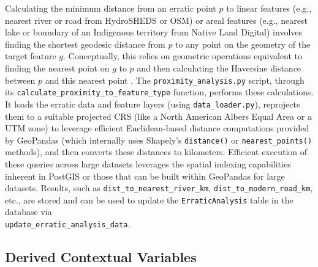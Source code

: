\documentclass[
11pt, %
english, %
singlespacing, %
headsepline, %
]{MastersDoctoralThesis} %
\begin{document}
Calculating the minimum distance from an erratic point $p$ to linear features (e.g., nearest river or road from HydroSHEDS or OSM) or areal features (e.g., nearest lake or boundary of an Indigenous territory from Native Land Digital) involves finding the shortest geodesic distance from $p$ to any point on the geometry of the target feature $g$. Conceptually, this relies on geometric operations equivalent to finding the nearest point on $g$ to $p$ and then calculating the Haversine distance between $p$ and this nearest point \cite{Goodchild1992}. The \texttt{proximity\_analysis.py} script, 
through its \texttt{calculate\_proximity\_to\_feature\_type} 
function, performs these calculations. It loads the erratic data and feature layers (using \texttt{data\_loader.py}), 
reprojects them to a suitable projected CRS (like a North American Albers Equal Area or a UTM zone) to leverage efficient Euclidean-based distance computations provided by GeoPandas (which internally uses Shapely's \texttt{distance()} or \texttt{nearest\_points()} methods), 
and then converts these distances to kilometers. Efficient execution of these queries 
across large datasets leverages the spatial indexing capabilities inherent in PostGIS or
those that can be built within GeoPandas for large datasets. Results, such as 
\texttt{dist\_to\_nearest\_river\_km}, \texttt{dist\_to\_modern\_road\_km}, etc., are 
stored and can be used to update the \texttt{ErraticAnalysis} 
table in the database via \\ \texttt{update\_erratic\_analysis\_data}.

\subsection{Derived Contextual Variables}
\label{subsec:derived_vars}
\end{document}
